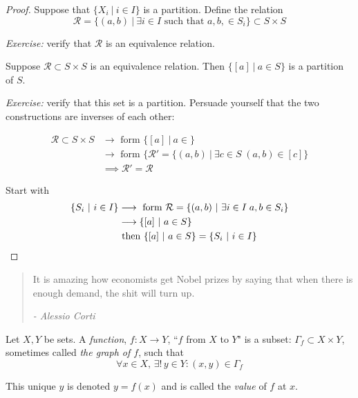 \documentclass[10pt]{scrartcl}
\newcommand{\rel}{\mathcal{R}}
\begin{document}
\begin{proof}
Suppose that $\{X_i ~|~ i \in I\}$ is a partition. Define the relation
\[\rel = \{(a,b) ~|~ \exists i \in I \text{ such that } a,b, \in S_i\} \subset S \times S\]

\emph{Exercise:} verify that $\rel$ is an equivalence relation.

Suppose $\rel \subset S \times S$ is an equivalence relation. Then 
$\{[a] ~|~ a \in S\}$
is a partition of $S$. 

\emph{Exercise:} verify that this set is a partition. Persuade yourself that the two constructions are inverses of each other:


\[\begin{aligned}\rel \subset S \times S &\longrightarrow \text{ form } \{[a] ~|~ a \in \}\\ &\longrightarrow \text{ form } \{\rel' = \{(a,b) ~|~ \exists c \in S\; (a,b) \in [c]\}\\
&\implies \rel' = \rel
\end{aligned}
\]

Start with 
\[\begin{aligned}\{S_i ~|~ i \in I\}&\longrightarrow \text{ form } \rel = \{(a,b) ~|~ \exists i \in I\; a,b \in S_i\}\\
&\longrightarrow \{[a] ~|~ a \in S\}\\
&\text{ then } \{[a] ~|~ a \in S\} = \{S_i ~|~ i \in I\}\qedhere
\end{aligned}\]  
\end{proof}




\begin{quote}
It is amazing how economists get Nobel prizes by saying that when there is enough demand, the shit will turn up.\begin{flushright}
      \textit{ -  Alessio Corti}
       \end{flushright} 
\end{quote} \vspace*{15pt}

\begin{definition} 
Let $X,Y$ be sets. A \emph{function}, $f: X \to Y$, ``$f$ from $X$ to $Y$" is a subset: $\Gamma_f \subset X \times Y$, sometimes called \emph{the graph of $f$}, such that 
\[\forall x \in X,\,\exists!\, y \in Y: (x,y) \in \Gamma_f\]	

This unique $y$ is denoted $y = f(x)$ and is called the \emph{value} of $f$ at $x$. 
\end{definition}
\end{document}
